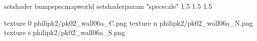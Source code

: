 setshader bumpspecmapworld
setshaderparam "specscale" 1.5 1.5 1.5

texture 0 philipk2/pk02_wall06a_C.png
texture n philipk2/pk02_wall06a_N.png
texture s philipk2/pk02_wall06a_S.png

